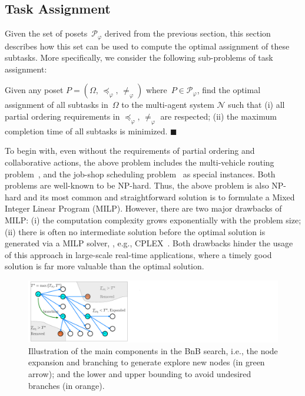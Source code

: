 \subsection{Task Assignment}\label{subsubsec:task-assignment}
Given the set of posets~$\mathcal{P}_{\varphi}$ derived from the previous
section, this section describes how this set can be used to compute
the optimal assignment of these subtasks. More specifically, we consider
the following sub-problems of task assignment:

\begin{problem}\label{problem:}
Given any poset $P=(\Omega,\, \preceq_{\varphi},\, \neq_{\varphi})$
where~$P\in \mathcal{P}_{\varphi}$,
find the optimal assignment of all subtasks in~$\Omega$ to the multi-agent system
$\mathcal{N}$ such that
(i) all partial ordering requirements in $\preceq_{\varphi},\, \neq_{\varphi}$ are
respected; (ii) the maximum completion time of all subtasks is minimized.
\hfill $\blacksquare$
\end{problem}



To begin with, even without the requirements of partial ordering
and collaborative actions, the above problem includes the multi-vehicle routing
problem~\cite{gini2017multi, khamis2015multi},
and the job-shop scheduling problem~\cite{brucker1994branch} as special instances.
Both problems are well-known to be NP-hard.
Thus, the above problem is also NP-hard and its most common and straightforward solution
is to formulate a Mixed Integer Linear Program (MILP). 
{However, there are two major drawbacks of MILP:
(i) the computation complexity grows exponentially with the problem size;
(ii) there is often no intermediate solution before the optimal solution is generated via a MILP solver,
, e.g., CPLEX~\cite{lima2010ibm}.
Both drawbacks hinder the usage of this approach in large-scale real-time applications,
where a timely good solution is far more valuable than the optimal solution.}

\begin{figure}[t!]
	\centering
	\includegraphics[width=0.9\linewidth]{figures/bnb_graph3.pdf}
	\caption{
		Illustration of the main components in the BnB search,
		i.e., the node expansion and branching to generate explore new nodes (in green arrow);
		and the lower and upper bounding to avoid undesired branches (in orange).}
	\label{fig:bnb_search_logic}
\end{figure}

